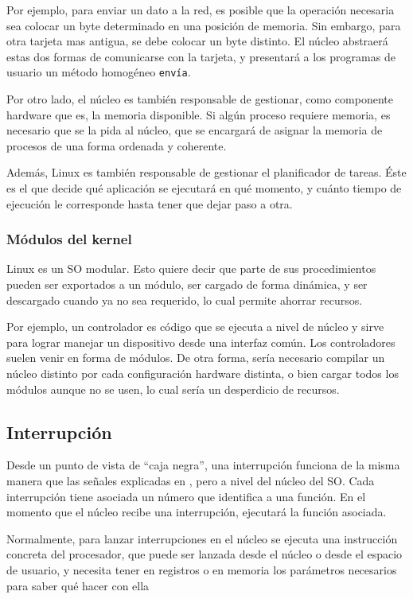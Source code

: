 Por ejemplo, para enviar un dato a la red, es posible que la operación necesaria sea colocar un byte determinado en una 
posición de memoria. Sin embargo, para otra tarjeta mas antigua, se debe colocar un byte distinto. El núcleo abstraerá 
estas dos formas de comunicarse con la tarjeta, y presentará a los programas de usuario un método homogéneo 
\texttt{envía}.

Por otro lado, el núcleo es también responsable de gestionar, como componente hardware que es, la memoria disponible. 
Si algún proceso requiere memoria, es necesario que se la pida al núcleo, que se encargará de asignar la memoria de 
procesos de una forma ordenada y coherente.

Además, Linux es también responsable de gestionar el planificador de tareas. Éste es el que decide qué aplicación se 
ejecutará en qué momento, y cuánto tiempo de ejecución le corresponde hasta tener que dejar paso a otra. 

\subsubsection{Módulos del kernel}
Linux es un \gls{SO} modular. Esto quiere decir que parte de sus procedimientos pueden ser exportados a un módulo, ser 
cargado de forma dinámica, y ser descargado cuando ya no sea requerido, lo cual permite ahorrar recursos.

Por ejemplo, un controlador es código que se ejecuta a nivel de núcleo y sirve para lograr manejar un dispositivo desde 
una interfaz común. Los controladores suelen venir en forma de módulos. De otra forma, sería necesario compilar un 
núcleo distinto por cada configuración hardware distinta, o bien cargar todos los módulos aunque no se usen, lo cual 
sería un desperdicio de recursos.

\subsection{Interrupción}
Desde un punto de vista de ``caja negra'', una interrupción funciona de la misma manera que las señales explicadas en 
, pero a nivel del núcleo del \gls{SO}. Cada interrupción tiene asociada un número que identifica a una 
función. En el momento que el núcleo recibe una interrupción, ejecutará la función asociada.

Normalmente, para lanzar interrupciones en el núcleo se ejecuta una instrucción concreta del procesador, que puede ser 
lanzada desde el núcleo o desde el espacio de usuario, y necesita tener en registros o en memoria los parámetros 
necesarios para saber qué hacer con ella

